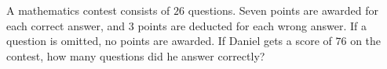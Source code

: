 A mathematics contest consists of $26$ questions. Seven points are awarded for each correct answer, and $3$ points are deducted for each wrong answer. If a question is omitted, no points are awarded. If Daniel gets a score of $76$ on the contest, how many questions did he answer correctly?
